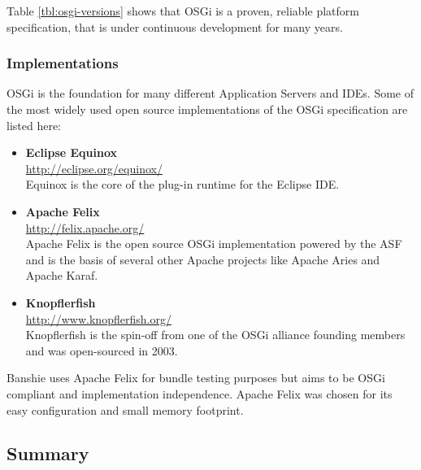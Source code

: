 Table \ref{tbl:osgi-versions} shows that OSGi is a proven, reliable platform specification, that is under continuous development for many years.

\subsubsection{Implementations}
\gls{OSGi} is the foundation for many different Application Servers and IDEs. Some of the most widely used open source implementations of the \gls{OSGi} specification are listed here: 

\begin{itemize}
	\item \textbf{Eclipse Equinox} \\
		\url{http://eclipse.org/equinox/} \\
		Equinox is the core of the plug-in runtime for the Eclipse IDE.
	\item \textbf{Apache Felix} \\
		\url{http://felix.apache.org/} \\
		Apache Felix is the open source \gls{OSGi} implementation powered by the \gls{ASF} and is the basis of several other Apache projects like Apache Aries and Apache Karaf.
	\item \textbf{Knopflerfish} \\
		\url{http://www.knopflerfish.org/} \\
		Knopflerfish is the spin-off from one of the \gls{OSGi} alliance founding members and was open-sourced in 2003.
\end{itemize}

Banshie uses Apache Felix for bundle testing purposes but aims to be \gls{OSGi} compliant and implementation independence. Apache Felix was chosen for its easy configuration and small memory footprint.

\subsection{Summary}
